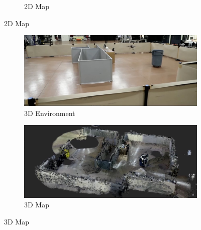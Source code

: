 \documentclass[11pt,professionalfonts,hyperref={pdftex,pdfpagemode=none,pdfstartview=FitH}]{beamer}
\begin{document}
\begin{frame}
\begin{figure}
\begin{subfigure}[t]{.3\linewidth}
    \caption*{2D Map}
  \end{subfigure}
  \end{figure}
  \begin{figure}
  \centering
  \begin{subfigure}[t]{.3\linewidth}
    \centering\includegraphics[height=.5\linewidth]{experiment_south.jpg}
    \caption*{3D Environment}
  \end{subfigure}
  \hspace*{0.1\linewidth}
  \begin{subfigure}[t]{.3\linewidth}
    \centering\includegraphics[height=.5\linewidth]{experiment_ogm3D_2min47sec.jpg}
    \caption*{3D Map}
  \end{subfigure}
\end{figure}

\end{frame}
\end{document}

